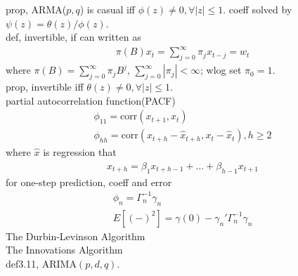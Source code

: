 \documentclass[paper=a4, fontsize=11pt]{scrartcl} %
\numberwithin{equation}{section} %
\numberwithin{figure}{section} %
\numberwithin{table}{section} %
\begin{document}
prop, ARMA($p,q$) is casual iff $\phi(z)\neq 0,\forall|z|\leq 1$. coeff solved by $\psi(z) = \theta(z)/\phi(z)$.\\
def, invertible, if can written as
\begin{align}
	\pi(B)x_t = \sum_{j=0}^\infty \pi_j x_{t-j} = w_t
\end{align}
where $\pi(B)=\sum_{j=0}^\infty\pi_jB^j$, $\sum_{j=0}^\infty |\pi_j|<\infty$; wlog set $\pi_0=1$.\\
prop, invertible iff $\theta(z)\neq 0,\forall |z|\leq 1$.\\
partial autocorrelation function(PACF)
\begin{align}
	\phi_{11}=\text{corr}(x_{t+1}, x_t)\\
	\phi_{hh}=\text{corr}(x_{t+h}-\widehat{x}_{t+h}, x_t - \widehat{x}_t), h\geq 2
\end{align}
where $\widehat{x}$ is regression that
\begin{align}
	\widehat{x}_{t+h} = \beta_1 x_{t+h-1}+\dots +\beta_{h-1}x_{t+1}
\end{align}
for one-step prediction, coeff and error
\begin{align}
	\phi_n = \Gamma_n^{-1}\gamma_n\\
	E[(-)^2] = \gamma(0) - \gamma_n'\Gamma_n^{-1}\gamma_n
\end{align}
The Durbin-Levinson Algorithm\\
The Innovations Algorithm\\
def3.11, ARIMA$(p,d,q)$.
\end{document}
